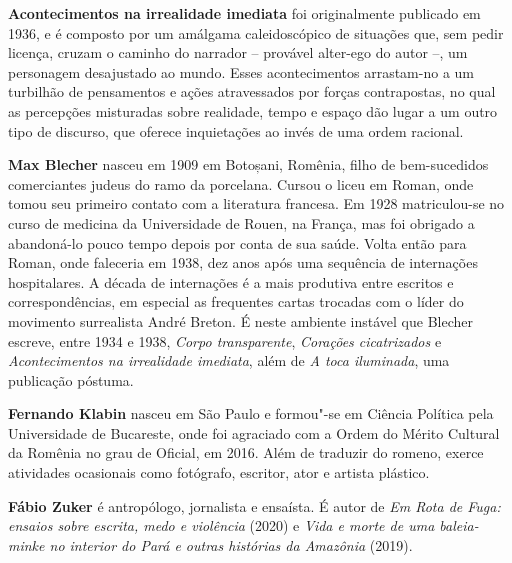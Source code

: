 \textbf{Acontecimentos na irrealidade imediata} foi originalmente publicado em 1936, e é composto por um amálgama caleidoscópico de situações que, sem pedir licença, cruzam o caminho do narrador -- provável alter-ego do autor --, um personagem desajustado ao mundo. Esses acontecimentos arrastam-no a um turbilhão de pensamentos e ações atravessados por forças contrapostas, no qual as percepções misturadas sobre realidade, tempo e espaço dão lugar a um outro tipo de discurso, que oferece inquietações ao invés de uma ordem racional.

\textbf{Max Blecher} nasceu em 1909 em Botoșani, Romênia, filho de bem-sucedidos comerciantes judeus do ramo da porcelana. Cursou o liceu em Roman, onde tomou seu primeiro contato com a literatura francesa. Em 1928 matriculou-se no curso de medicina da Universidade de Rouen, na França, mas foi obrigado a abandoná-lo pouco tempo depois por conta de sua saúde. Volta então para Roman, onde faleceria em 1938, dez anos após uma sequência de internações hospitalares. A década de internações é a mais produtiva entre escritos e correspondências, em especial as frequentes cartas trocadas com o líder do movimento surrealista André Breton. É neste ambiente instável que Blecher escreve, entre 1934 e 1938, \textit{Corpo transparente}, \textit{Corações cicatrizados} e \textit{Acontecimentos na irrealidade imediata}, além de \textit{A toca iluminada}, uma publicação póstuma.

\textbf{Fernando Klabin} nasceu em São Paulo e formou"-se em Ciência Política pela Universidade de Bucareste, onde foi agraciado com a Ordem do Mérito Cultural da Romênia no grau de Oficial, em 2016. Além de traduzir do romeno, exerce atividades ocasionais como fotógrafo, escritor, ator e artista plástico.

\textbf{Fábio Zuker} é antropólogo, jornalista e ensaísta. É autor de \textit{Em Rota de Fuga: ensaios sobre escrita, medo e violência} (2020) e \textit{Vida e morte de uma baleia-minke no interior do Pará e outras histórias da Amazônia} (2019).

